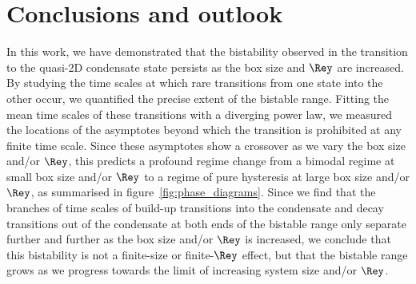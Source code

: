 \documentclass[]{jfm}
\begin{document}
\section{Conclusions and outlook}\label{sec:conclusions} %
In this work, we have demonstrated that the bistability observed in the transition to the quasi-2D condensate state persists as the box size and $\Rey$ are increased. By studying the time scales at which rare transitions from one state into the other occur, we quantified the precise extent of the bistable range. Fitting the mean time scales of these transitions with a diverging power law, we measured the locations of the asymptotes beyond which the transition is prohibited at any finite time scale. Since these asymptotes show a crossover as we vary the box size and/or $\Rey$, this predicts a profound regime change from a bimodal regime at small box size and/or $\Rey$ to a regime of pure hysteresis at large box size and/or $\Rey$, as summarised in figure~\ref{fig:phase_diagrams}. Since we find that the branches of time scales of build-up transitions into the condensate and decay transitions out of the condensate at both ends of the bistable range only separate further and further as the box size and/or $\Rey$ is increased, we conclude that this bistability is not a finite-size or finite-$\Rey$ effect, but that the bistable range grows as we progress towards the limit of increasing system size and/or $\Rey$.
\end{document}
